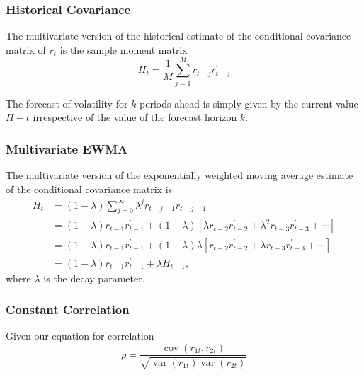 \documentclass[11pt]{article}
\begin{document}
\subsubsection{Historical Covariance}

The multivariate version of the historical estimate of the conditional covariance matrix of $r_t$ is the sample moment matrix
\begin{equation}
H_t=\frac{1}{M} \sum_{j=1}^M r_{t-j} r_{t-j}^{\prime}
\end{equation}

\begin{note}
The forecast of volatility for $k$-periods ahead is simply given by the current value $H-t$ irrespective of the value of the forecast horizon $k$.    
\end{note}

\subsubsection{Multivariate EWMA}

The multivariate version of the exponentially weighted moving average estimate of the conditional covariance matrix is
\begin{equation}
\begin{aligned}
H_t & =(1-\lambda) \sum_{j=0}^{\infty} \lambda^j r_{t-j-1} r_{t-j-1}^{\prime} \\
& =(1-\lambda) r_{t-1} r_{t-1}^{\prime}+(1-\lambda)\left[\lambda r_{t-2} r_{t-2}^{\prime}+\lambda^2 r_{t-3} r_{t-3}^{\prime}+\cdots\right] \\
& =(1-\lambda) r_{t-1} r_{t-1}^{\prime}+(1-\lambda) \lambda\left[r_{t-2} r_{t-2}^{\prime}+\lambda r_{t-3} r_{t-3}^{\prime}+\cdots\right] \\
& =(1-\lambda) r_{t-1} r_{t-1}^{\prime}+\lambda H_{t-1},
\end{aligned}
\end{equation}
where $\lambda$ is the decay parameter.

\subsubsection{Constant Correlation}

Given our equation for correlation
\begin{equation*}
\rho=\frac{\operatorname{cov}\left(r_{1 t}, r_{2 t}\right)}{\sqrt{\operatorname{var}\left(r_{1 t}\right) \operatorname{var}\left(r_{2 t}\right)}}
\end{equation*}
\end{document}
